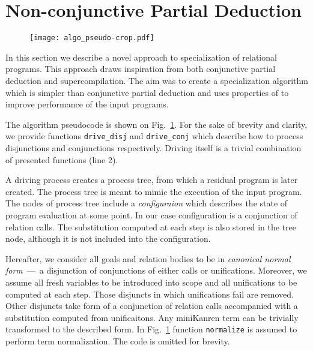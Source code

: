 \newcommand{\code}[1]{\texttt{#1}}

\section{Non-conjunctive Partial Deduction}

\begin{figure}[!t]
  \centering
  \texttt{[image: algo\_pseudo-crop.pdf]}
  \caption{}
  \label{fig:ncpd-pseudo}
\end{figure}

In this section we describe a novel approach to specialization of relational programs.
This approach draws inspiration from both conjunctive partial deduction and supercompilation.
The aim was to create a specialization algorithm which is simpler than conjunctive partial deduction and uses properties of \mk{} to improve performance of the input programs.

The algorithm pseudocode is shown on Fig.~\ref{fig:ncpd-pseudo}.
For the sake of brevity and clarity, we provide functions \code{drive\_disj} and \code{drive\_conj} which describe how to process disjunctions and conjunctions respectively.
Driving itself is a trivial combination of presented functions (line 2).

A driving process creates a process tree, from which a residual program is later created.
The process tree is meant to mimic the execution of the input program.
The nodes of process tree include a \emph{configuraion} which describes the state of program evaluation at some point.
In our case configuration is a conjunction of relation calls.
The substitution computed at each step is also stored in the tree node, although it is not included into the configuration.

Hereafter, we consider all goals and relation bodies to be in \emph{canonical normal form}~---~a disjunction of conjunctions of either calls or unifications.
Moreover, we assume all fresh variables to be introduced into scope and all unifications to be computed at each step.
Those disjuncts in which unifications fail are removed.
Other disjuncts take form of a conjunction of relation calls accompanied with a substitution computed from unificaitons.
Any miniKanren term can be trivially transformed to the described form.
In Fig.~\ref{fig:ncpd-pseudo} function \code{normalize} is assumed to perform term normalization.
The code is omitted for brevity.



